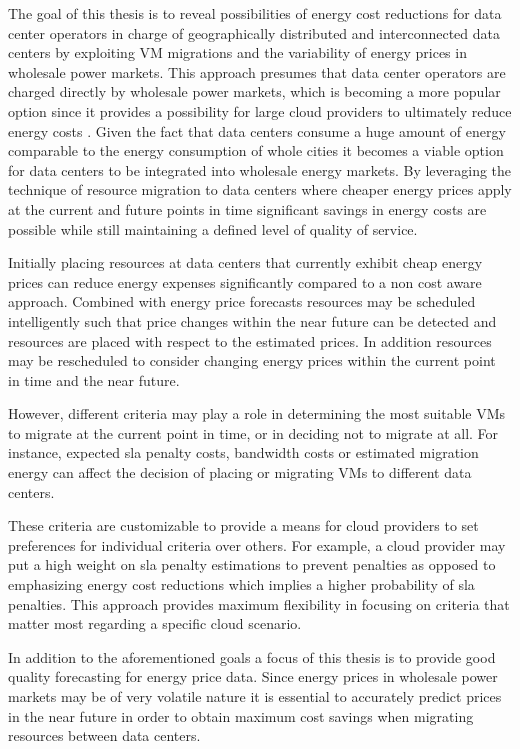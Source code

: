 The goal of this thesis is to reveal possibilities of energy cost reductions for data center operators in charge of geographically distributed and interconnected data centers by exploiting VM migrations and the variability of energy prices in wholesale power markets. This approach presumes that data center operators are charged directly by wholesale power markets, which is becoming a more popular option since it provides a possibility for large cloud providers to ultimately reduce energy costs \cite{dcw2013optimizing}. 
Given the fact that data centers consume a huge amount of energy comparable to the energy consumption of whole cities\cite{qureshi2009cutting} it becomes a viable option for data centers to be integrated into wholesale energy markets. By leveraging the technique of resource migration to data centers where cheaper energy prices apply at the current and future points in time significant savings in energy costs are possible while still maintaining a defined level of quality of service. 

Initially placing resources at data centers that currently exhibit cheap energy prices can reduce energy expenses significantly compared to a non cost aware approach. Combined with energy price forecasts resources may be scheduled intelligently such that price changes within the near future can be detected and resources are placed with respect to the estimated prices. In addition resources may be rescheduled to consider changing energy prices within the current point in time and the near future. 
 
However, different criteria may play a role in determining the most suitable VMs to migrate at the current point in time, or in deciding not to migrate at all. For instance, expected sla penalty costs, bandwidth costs or estimated migration energy can affect the decision of placing or migrating VMs to different data centers. 

These criteria are customizable to provide a means for cloud providers to set preferences for individual criteria over others. For example, a cloud provider may put a high weight on sla penalty estimations to prevent penalties as opposed to emphasizing energy cost reductions which implies a higher probability of sla penalties. 
This approach provides maximum flexibility in focusing on criteria that matter most regarding a specific cloud scenario. 

In addition to the aforementioned goals a focus of this thesis is to provide good quality forecasting for energy price data. Since energy prices in wholesale power markets may be of very volatile nature it is essential to accurately predict prices in the near future in order to obtain maximum cost savings when migrating resources between data centers. 


